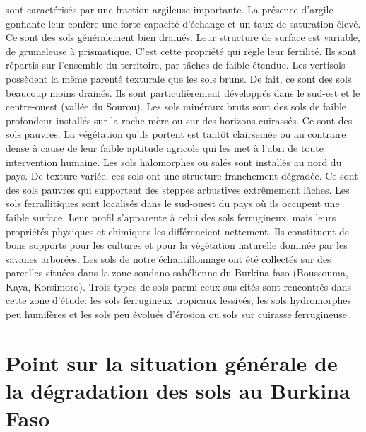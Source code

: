 \documentclass[a4paper,11pt]{article}
\begin{document}
sont caractérisés par une fraction argileuse importante. La présence
d'argile gonflante leur confère une forte capacité d'échange et un
taux de saturation élevé. Ce sont des sols généralement bien
drainés. Leur structure de surface est variable, de grumeleuse à
prismatique. C'est cette propriété qui règle leur fertilité. Ils sont
répartis sur l'ensemble du territoire, par tâches de faible
étendue. Les vertisols possèdent la même parenté texturale que les
sols bruns. De fait, ce sont des sols beaucoup moins drainés. Ils sont
particulièrement développés dans le sud-est et le centre-ouest (vallée
du Sourou). Les sols minéraux bruts sont des sols de faible profondeur
installés sur la roche-mère ou sur des horizons cuirassés. Ce sont des
sols pauvres. La végétation qu'ils portent est tantôt clairsemée ou au
contraire dense à cause de leur faible aptitude agricole qui les met à
l'abri de toute intervention humaine. Les sols halomorphes ou salés
sont installés au nord du pays. De texture variée, ces sols ont une
structure franchement dégradée. Ce sont des sols pauvres qui
supportent des steppes arbustives extrêmement lâches. Les sols
ferrallitiques sont localisés dans le sud-ouest du pays où ils
occupent une faible surface. Leur profil s'apparente à celui des sols
ferrugineux, mais leurs propriétés physiques et chimiques les
différencient nettement. Ils constituent de bons supports pour les
cultures et pour la végétation naturelle dominée par les savanes
arborées. Les sols de notre échantillonnage ont été collectés sur des
parcelles situées dans la zone soudano-sahélienne du Burkina-faso
(Boussouma, Kaya, Korsimoro). Trois types de sols parmi ceux
sus-cités sont rencontrés dans cette zone d'étude: les sols
ferrugineux tropicaux lessivés, les sols hydromorphes peu humifères
et les sols peu évolués d'érosion ou sols sur cuirasse
ferrugineuse\,\cite{TIROGO_2017}.

\section{Point sur la situation générale de la dégradation des sols au Burkina Faso}
\end{document}
